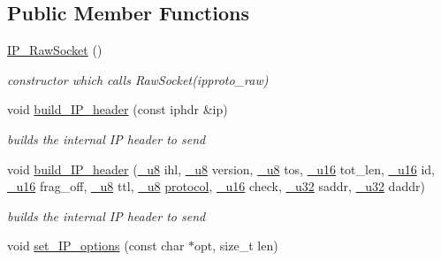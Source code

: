 \subsection*{Public Member Functions}
\begin{CompactItemize}
\item 
\hyperlink{classsocketpp_1_1IP__RawSocket_e523748e7ca5bbcf7b74d804d356630e}{IP\_\-RawSocket} ()
\begin{CompactList}\small\item\em constructor which calls RawSocket(ipproto\_\-raw) \item\end{CompactList}\item 
void \hyperlink{classsocketpp_1_1IP__RawSocket_f93c51a7a8284fe9d2b24019b13a5803}{build\_\-IP\_\-header} (const iphdr \&ip)
\begin{CompactList}\small\item\em builds the internal IP header to send \item\end{CompactList}\item 
void \hyperlink{classsocketpp_1_1IP__RawSocket_661a0ec3a92e7cd5582e64a3d0ed5e80}{build\_\-IP\_\-header} (\hyperlink{namespacesocketpp_1398da7d8125cdb32e89041e5b0adb96}{\_\-u8} ihl, \hyperlink{namespacesocketpp_1398da7d8125cdb32e89041e5b0adb96}{\_\-u8} version, \hyperlink{namespacesocketpp_1398da7d8125cdb32e89041e5b0adb96}{\_\-u8} tos, \hyperlink{namespacesocketpp_0d48e817f00cbb84d07faec41ee4b169}{\_\-u16} tot\_\-len, \hyperlink{namespacesocketpp_0d48e817f00cbb84d07faec41ee4b169}{\_\-u16} id, \hyperlink{namespacesocketpp_0d48e817f00cbb84d07faec41ee4b169}{\_\-u16} frag\_\-off, \hyperlink{namespacesocketpp_1398da7d8125cdb32e89041e5b0adb96}{\_\-u8} ttl, \hyperlink{namespacesocketpp_1398da7d8125cdb32e89041e5b0adb96}{\_\-u8} \hyperlink{namespacesocketpp_2969678def1c6c8cb4102802ca82e2cf}{protocol}, \hyperlink{namespacesocketpp_0d48e817f00cbb84d07faec41ee4b169}{\_\-u16} check, \hyperlink{namespacesocketpp_d9c3b2ad093bb5814af59760e0a2192a}{\_\-u32} saddr, \hyperlink{namespacesocketpp_d9c3b2ad093bb5814af59760e0a2192a}{\_\-u32} daddr)
\begin{CompactList}\small\item\em builds the internal IP header to send \item\end{CompactList}\item 
void \hyperlink{classsocketpp_1_1IP__RawSocket_82c0b2c75d081bc84d8e60bf18199e65}{set\_\-IP\_\-options} (const char $\ast$opt, size\_\-t len)

\end{CompactItemize}
